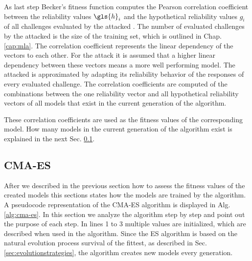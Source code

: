 As last step Becker's fitness function computes the Pearson correlation coefficient between the reliability values $\gls{h}_i$ and the hypothetical reliability values $g_i$ of all challenges evaluated by the attacked \puf.
The number of evaluated challenges by the attacked \puf is the size of the training set, which is outlined in Chap. \ref{cap:mla}.
The correlation coefficient represents the linear dependency of the vectors to each other.
For the attack it is assumed that a higher linear dependency between these vectors means a more well performing model. %
The attacked \puf is approximated by adapting its reliability behavior of the responses of every evaluated challenge.
The correlation coefficients are computed of the combinations between the one reliability vector and all hypothetical reliability vectors of all models that exist in the current generation of the algorithm.

These correlation coefficients are used as the fitness values of the corresponding model.
How many models in the current generation of the algorithm exist is explained in the next Sec. \ref{sec:cma-esdesign}.


\subsection{CMA-ES}
\label{sec:cma-esdesign}

After we described in the previous section how to assess the fitness values of the created models this sections states how the models are trained by the algorithm.
A pseudocode representation of the \ac{CMA-ES} algorithm is displayed in Alg. \ref{alg:cma-es}.
In this section we analyze the algorithm step by step and point out the purpose of each step. %
In lines 1 to 3 multiple values are initialized, which are described when used in the algorithm.
Since the \ac{ES} algorithm is based on the natural evolution process survival of the fittest, as described in Sec. \ref{sec:evolutionstrategies}, the algorithm creates new models every generation. %

